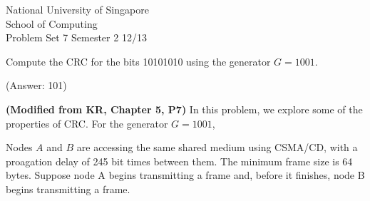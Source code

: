 \documentclass[a4paper,11pt,answers]{exam}
\begin{document}
    \extraheadheight{.5in}
    {\large\sf National University of Singapore\\ School of Computing \\
    \LARGE\sf Problem Set 7}%
    {\large\sf Semester 2 12/13}
    \firstpageheadrule
    \pagestyle{headandfoot}

    \begin{questions}
	\question 
	Compute the CRC for the bits 10101010 using the generator $G = 1001$.
	
	(Answer: 101)

	\question \textbf{(Modified from KR, Chapter 5, P7)}
	In this problem, we explore some of the properties of CRC.  
	For the generator $G = 1001$,
	\begin{solution}
		
	\end{solution}


	\question 
	Nodes $A$ and $B$ are accessing the same shared medium using CSMA/CD, 
	with a proagation delay of 245 bit times between them.  The minimum 
	frame size is 64 bytes.  Suppose node A begins transmitting a frame 
	and, before it finishes, node B begins transmitting a frame.  



\end{questions}
\end{document}
